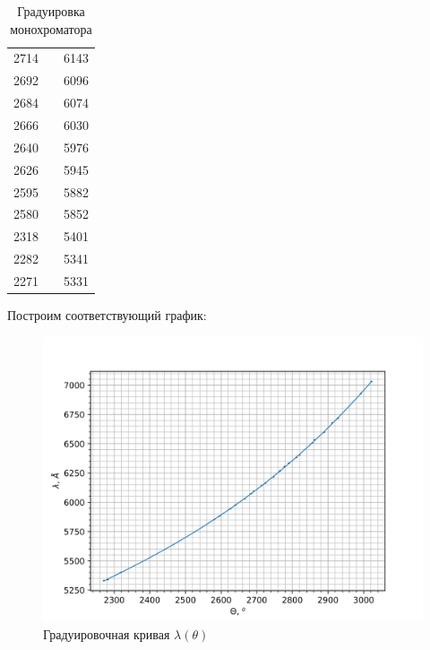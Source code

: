 \documentclass[a4paper,12pt]{report}
\begin{document}
\begin{table}[H]
\begin{tabular}{|c|c|c|}
2714     &                     & 6143                         \\ \cline{1-1} \cline{3-3} 
2692     &                     & 6096                         \\ \cline{1-1} \cline{3-3} 
2684     &                     & 6074                         \\ \cline{1-1} \cline{3-3} 
2666     &                     & 6030                         \\ \cline{1-1} \cline{3-3} 
2640     &                     & 5976                         \\ \cline{1-1} \cline{3-3} 
2626     &                     & 5945                         \\ \cline{1-1} \cline{3-3} 
2595     &                     & 5882                         \\ \cline{1-1} \cline{3-3} 
2580     &                     & 5852                         \\ \cline{1-1} \cline{3-3} 
2318     &                     & 5401                         \\ \cline{1-1} \cline{3-3} 
2282     &                     & 5341                         \\ \cline{1-1} \cline{3-3} 
2271     &                     & 5331                         \\ \hline
\end{tabular}
\caption{Градуировка монохроматора}
\end{table}

Построим соответствующий график:

\begin{figure}[H]
\centering
\includegraphics[width=0.7\linewidth]{grad.png}
\caption{Градуировочная кривая $\lambda(\theta)$}
\label{ris grad}
\end{figure}
\end{document}

